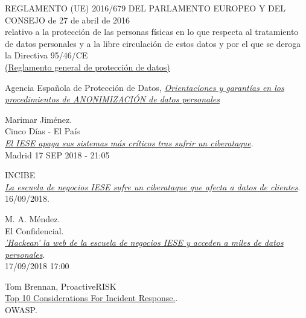 \documentclass[10pt,a4paper]{article}
\begin{document}
\begin{thebibliography}{9}

  REGLAMENTO (UE) 2016/679 DEL PARLAMENTO EUROPEO Y DEL CONSEJO de 27 de abril de 2016\\
relativo a la protección de las personas físicas en lo que respecta al tratamiento de datos personales y a la libre circulación de estos datos y por el que se deroga la Directiva 95/46/CE\\
  \href{https://www.boe.es/doue/2016/119/L00001-00088.pdf}{(Reglamento general de protección de datos)}

  Agencia Española de Protección de Datos,
  \href{https://www.aepd.es/media/guias/guia-orientaciones-procedimientos-anonimizacion.pdf}{\textit{Orientaciones y garantías en los procedimientos de ANONIMIZACIÓN de datos personales}}
  
 Marimar Jiménez.\\
  Cinco Días - El País\\
 \href{https://cincodias.elpais.com/cincodias/2018/09/17/companias/1537210351_227985.html}{\textit{El IESE apaga sus sistemas más críticos tras sufrir un ciberataque}}.\\
 Madrid  17 SEP 2018 - 21:05
 
  INCIBE\\
\href{https://www.incibe-cert.es/alerta-temprana/bitacora-ciberseguridad/escuela-negocios-iese-sufre-ciberataque-afecta-datos}{\textit{La escuela de negocios IESE sufre un ciberataque que afecta a datos de clientes}}.\\
16/09/2018.

  M. A. Méndez.\\
  El Confidencial.\\
  \href{https://www.elconfidencial.com/tecnologia/2018-09-16/anonymous-iese-hackers-hackeos-escuela-de-negocios_1616774/}{\textit{'Hackean' la web de la escuela de negocios IESE y acceden a miles de datos personales}}.\\
  17/09/2018 17:00
  
  Tom Brennan, ProactiveRISK\\
  \href{https://www.owasp.org/images/b/bd/IR_Top_10_Considerations_-_Slides-v2.pdf}{Top 10 Considerations For Incident Response.}.\\
  OWASP.

\end{thebibliography}
\end{document}
